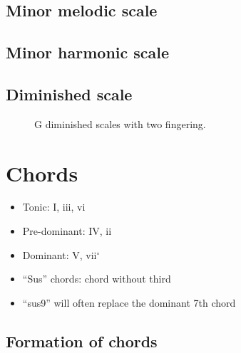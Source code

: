 \documentclass{article}
\begin{document}
\subsection{Minor melodic scale}

\subsection{Minor harmonic scale}

\subsection{Diminished scale}
\begin{figure}[h!]
	\centering
	\hspace*{-2cm}
	\scalebox{0.5}{}
	\hspace*{-2cm}
	\scalebox{0.5}{}
	\caption{G diminished scales with two fingering. }
	\label{fig:gammme_diminue}
\end{figure}


\clearpage
\section{Chords}

\begin{itemize}
	\item Tonic: I, iii, vi
	\item Pre-dominant: IV, ii
	\item Dominant: V, vii$^\circ$
\end{itemize}


\begin{itemize}
	\item ``Sus'' chords: chord without third
	\item ``sus9'' will often replace the dominant 7th chord
\end{itemize}

\clearpage
\subsection{Formation of chords}
\end{document}
